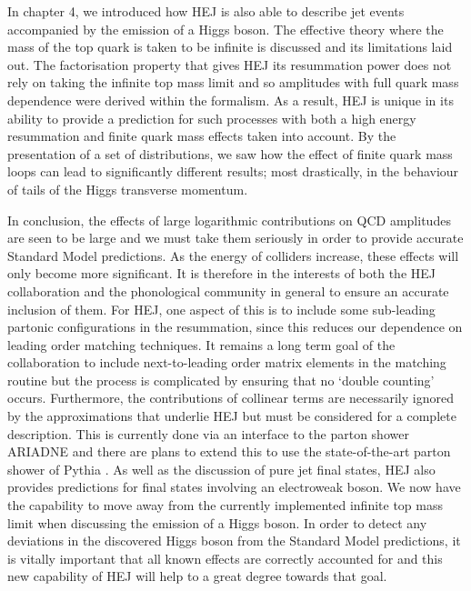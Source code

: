 In chapter 4, we introduced how HEJ is also able to describe jet events accompanied by the emission of a Higgs boson. The effective theory where the mass of the top quark is taken to be infinite is discussed and its limitations laid out. The factorisation property that gives HEJ its resummation power does not rely on taking the infinite top mass limit and so amplitudes with full quark mass dependence were derived within the formalism. As a result, HEJ is unique in its ability to provide a prediction for such processes with both a high energy resummation and finite quark mass effects taken into account. By the presentation of a set of distributions, we saw how the effect of finite quark mass loops can lead to significantly different results; most drastically, in the behaviour of tails of the Higgs transverse momentum. 

In conclusion, the effects of large logarithmic contributions on QCD amplitudes are seen to be large and we must take them seriously in order to provide accurate Standard Model predictions. As the energy of colliders increase, these effects will only become more significant. It is therefore in the interests of both the HEJ collaboration and the phonological community in general to ensure an accurate inclusion of them. For HEJ, one aspect of this is to include some sub-leading partonic configurations in the resummation, since this reduces our dependence on leading order matching techniques. It remains a long term goal of the collaboration to include next-to-leading order matrix elements in the matching routine but the process is complicated by ensuring that no `double counting' occurs. Furthermore, the contributions of collinear terms are necessarily ignored by the approximations that underlie HEJ but must be considered for a complete description. This is currently done via an interface to the parton shower ARIADNE and there are plans to extend this to use the state-of-the-art parton shower of Pythia \cite{Sjostrand2007}. As well as the discussion of pure jet final states, HEJ also provides predictions for final states involving an electroweak boson. We now have the capability to move away from the currently implemented infinite top mass limit when discussing the emission of a Higgs boson. In order to detect any deviations in the discovered Higgs boson from the Standard Model predictions, it is vitally important that all known effects are correctly accounted for and this new capability of HEJ will help to a great degree towards that goal.